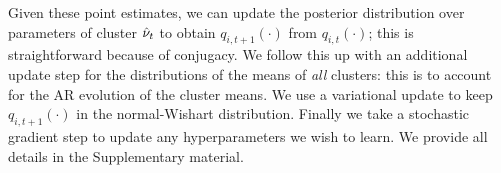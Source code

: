 Given these point estimates, we can update the posterior distribution over parameters of cluster $\hat{\nu}_t$ to obtain $q_{i,t+1}(\cdot)$ from 
$q_{i,t}(\cdot)$; this is straightforward because of conjugacy. We follow this up with an additional update step for the distributions of the means of
\emph{all} clusters: this is to account for the AR evolution of the cluster means. 
We use a variational update to keep  $q_{i,t+1}(\cdot)$ in the normal-Wishart distribution. Finally we take a stochastic gradient step to
update any hyperparameters we wish to learn. We provide all details in the Supplementary material.


